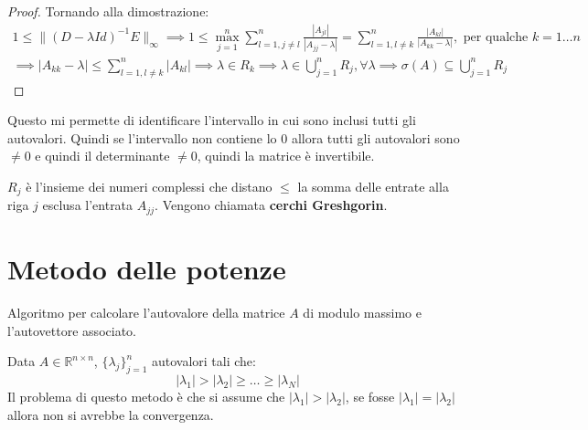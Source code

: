 \begin{teorema} 
\begin{proof}
        Tornando alla dimostrazione:
        \begin{equation*}
            \begin{aligned}
                1 \leq \|(D - \lambda Id)^{-1}E\|_\infty \implies 1 \leq \max_{j = 1}^n
                \sum_{l = 1,j \neq l}^{n} \frac{|A_{jl}|}{|A_{jj} - \lambda|} =
                \sum_{l = 1,l \neq k}^{n} \frac{|A_{kl}|}{|A_{kk} - \lambda|},
                \text{ per qualche }k = 1 \dots n \\ \implies |A_{kk} - \lambda| \leq
                \sum_{l = 1,l \neq k}^{n} |A_{kl}| \implies \lambda \in R_k \implies
                \lambda \in \bigcup_{j = 1}^n R_j, \forall \lambda \implies
                \sigma(A) \subseteq \bigcup_{j = 1}^n R_j
            \end{aligned}
        \end{equation*}
    \end{proof}
\end{teorema}
Questo mi permette di identificare l'intervallo in cui sono inclusi tutti gli
autovalori. Quindi se l'intervallo non contiene lo $0$ allora tutti gli autovalori
sono $\neq 0$ e quindi il determinante $\ne 0$, quindi la matrice è invertibile.
\begin{nota}
    $R_j$ è l'insieme dei numeri complessi che distano $\le$ la somma delle entrate
    alla riga $j$ esclusa l'entrata $A_{jj}$. Vengono chiamata \textbf{cerchi Greshgorin}.
\end{nota}
\section{Metodo delle potenze}
Algoritmo per calcolare l'autovalore della matrice $A$ di modulo massimo e
l'autovettore associato.

Data $A\in \mathbb{R}^{n\times n}$, $\{\lambda_j\}^n_{j = 1}$ autovalori tali che:
\begin{equation*}
    |\lambda_1|> |\lambda_2| \geq \dots \geq |\lambda_N|
\end{equation*}
Il problema di questo metodo è che si assume che $|\lambda_1|> |\lambda_2|$,
se fosse $|\lambda_1| = |\lambda_2|$ allora non si avrebbe la convergenza.

